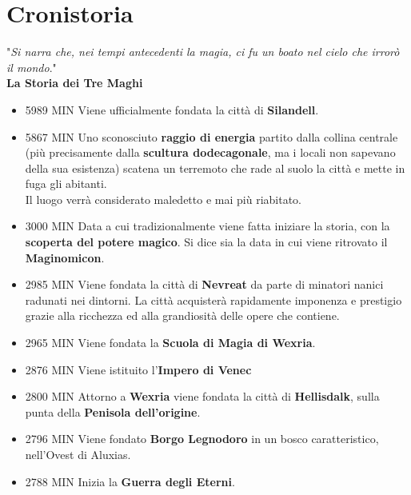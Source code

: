 \documentclass[10pt,twoside,onecolumn,openany]{book}
\begin{document}
\chapter{Cronistoria}
\begin{quotebox}
	"\textit{Si narra che, nei tempi antecedenti la magia, ci fu un boato nel cielo che irrorò il mondo}."\\ \textbf{La Storia dei Tre Maghi}
\end{quotebox}
\begin{multicols}{2}
\begin{itemize}
\itemsep-1em
\item 5989 MIN Viene ufficialmente fondata la città di \textbf{Silandell}.\\
\item 5867 MIN Uno sconosciuto \textbf{raggio di energia} partito dalla collina centrale (più precisamente dalla \textbf{scultura dodecagonale}, ma i locali non sapevano della sua esistenza) scatena un terremoto che rade al suolo la città e mette in fuga gli abitanti.\\
Il luogo verrà considerato maledetto e mai più riabitato.\\
\item 3000 MIN Data a cui tradizionalmente viene fatta iniziare la storia, con la \textbf{scoperta del potere magico}. Si dice sia la data in cui viene ritrovato il \textbf{Maginomicon}.\\
\item 2985 MIN Viene fondata la città di \textbf{Nevreat} da parte di minatori nanici radunati nei dintorni. La città acquisterà rapidamente imponenza e prestigio grazie alla ricchezza ed alla grandiosità delle opere che contiene.\\
\item 2965 MIN Viene fondata la \textbf{Scuola di Magia di Wexria}.\\
\item 2876 MIN Viene istituito l'\textbf{Impero di Venec}\\
\item 2800 MIN Attorno a \textbf{Wexria} viene fondata la città di \textbf{Hellisdalk}, sulla punta della \textbf{Penisola dell'origine}.\\
\item 2796 MIN Viene fondato \textbf{Borgo Legnodoro} in un bosco caratteristico, nell'Ovest di Aluxias.\\
\item 2788 MIN Inizia la \textbf{Guerra degli Eterni}.\\

\end{itemize}
\end{multicols}
\end{document}
